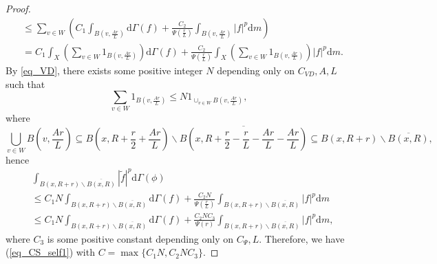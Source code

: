 \documentclass[11pt,a4paper]{article}
\numberwithin{equation}{section}
\theoremstyle{plain}
\theoremstyle{definition}
\begin{document}
\begin{proof}
\begin{align*}
&\le\sum_{v\in W}\left(C_{1}\int_{B(v,\frac{Ar}{L})}\mathrm{d}\Gamma(f)+\frac{C_{2}}{\Psi(\frac{r}{L})}\int_{B(v,\frac{Ar}{L})}|f|^p\mathrm{d} m\right)\\
&=C_1\int_X \left(\sum_{v\in W}1_{B(v,\frac{Ar}{L})}\right)\mathrm{d}\Gamma(f)+\frac{C_{2}}{\Psi(\frac{r}{L})}\int_X\left(\sum_{v\in W}1_{B(v,\frac{Ar}{L})}\right)|f|^p\mathrm{d} m.
\end{align*}
By \ref{eq_VD}, there exists some positive integer $N$ depending only on $C_{VD}, A, L$ such that
$$\sum_{v\in W}1_{B(v,\frac{Ar}{L})}\le N1_{\cup_{v\in W}B(v,\frac{Ar}{L})},$$
where
$${\bigcup_{v\in W}B(v,\frac{Ar}{L})}\subseteq B(x,R+\frac{r}{2}+\frac{Ar}{L})\backslash\overline{B(x,R+\frac{r}{2}-\frac{r}{L}-\frac{Ar}{L}-\frac{Ar}{L})}\subseteq B(x,R+r)\backslash\overline{B(x,R)},$$
hence
\begin{align*}
&\int_{B(x,R+r)\backslash\overline{B(x,R)}}|\widetilde{f}|^p\mathrm{d}\Gamma(\phi)\\
&\le C_1N\int_{B(x,R+r)\backslash\overline{B(x,R)}}\mathrm{d}\Gamma(f)+\frac{C_2N}{\Psi(\frac{r}{L})}\int_{B(x,R+r)\backslash\overline{B(x,R)}}|f|^p\mathrm{d} m\\
&\le C_1N\int_{B(x,R+r)\backslash\overline{B(x,R)}}\mathrm{d}\Gamma(f)+\frac{C_2NC_3}{\Psi({r})}\int_{B(x,R+r)\backslash\overline{B(x,R)}}|f|^p\mathrm{d} m,
\end{align*}
where $C_3$ is some positive constant depending only on $C_\Psi, L$. Therefore, we have (\ref{eq_CS_self1}) with $C=\max\{C_1N,C_2NC_3\}$.


\end{proof}
\end{document}
